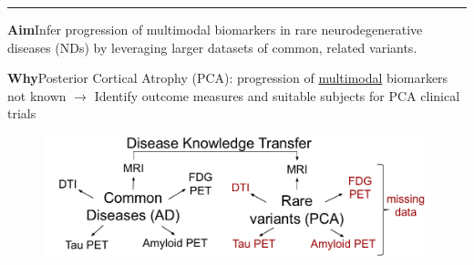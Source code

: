 \documentclass[portrait,a0,final,20pt]{a0poster}
\newcommand{\fnt}[1]{\LARGE{#1}}
\begin{document}
\fnt{


\newcommand{\lp}{\lambda_{d_i}^{\psi(k)}}
\newcommand{\lpuu}{\lambda_{d_i}^{\psi(k),(u)}}
\newcommand{\lpum}{\lambda_{d_i}^{\psi(k),(u-1)}}

\newcommand{\cmark}{\ding{51}}%
\newcommand{\xmark}{\ding{55}}%

\newcommand{\yes}{{\LARGE \textcolor{green!50!black}{\cmark} \par}}
\newcommand{\no}{{\LARGE \textcolor{red}{\xmark} \par}}

\vspace{0.2em}
\hrule
\vspace{0.2em}

\newcommand{\heading}[1]{\noindent\textbf{\Huge{#1}}}

\begin{multicols}{2}							
\raggedcolumns							%

\pagenumbering{gobble}

\vspace{-3em}

\heading{Aim}\;\;\;\;Infer progression of multimodal biomarkers in rare neurodegenerative diseases (NDs) by leveraging larger datasets of common, related variants.


\heading{Why}\;\;\;\;Posterior Cortical Atrophy (PCA): progression of \underline{multimodal} biomarkers not known $\rightarrow$ Identify outcome measures and suitable subjects for PCA clinical trials

\columnbreak

% 
% 
%  
%   
%  

\begin{figure}[H]
 \centering
 \includegraphics[width=\columnwidth]{DKT_data_availability}
\end{figure}



\end{multicols}}
\end{document}
